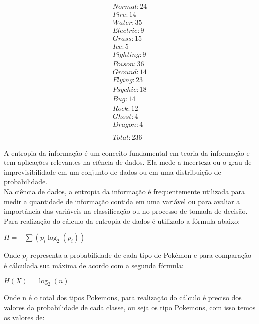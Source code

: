 \documentclass[a4paper,12pt]{article}
\begin{document}
\begin{align*}
Normal: 24 \\
Fire: 14 \\
Water: 35 \\
Electric: 9 \\
Grass: 15 \\
Ice: 5 \\
Fighting: 9 \\
Poison: 36 \\
Ground: 14 \\
Flying: 23 \\
Psychic: 18 \\
Bug: 14 \\
Rock: 12 \\
Ghost: 4 \\
Dragon: 4 \\
\\Total: 236     
\end{align*}


\pagebreak

A entropia da informação é um conceito fundamental em teoria da informação e tem aplicações relevantes na ciência de dados. Ela mede a incerteza ou o grau de imprevisibilidade em um conjunto de dados ou em uma distribuição de probabilidade.\\

Na ciência de dados, a entropia da informação é frequentemente utilizada para medir a quantidade de informação contida em uma variável ou para avaliar a importância das variáveis na classificação ou no processo de tomada de decisão.\\

Para realização do cálculo da entropia de dados é utilizado a fórmula abaixo:

\begin{center}
  $H = -\sum{(p_i \log_2(p_i))}$
\end{center}

Onde $p_i$ representa a probabilidade de cada tipo de Pokémon e para comparação é cálculada sua máxima de acordo com a segunda fórmula:

\begin{center}
$H(X) = \log_2(n)$ 
\end{center}

Onde n é o total dos tipos Pokemons, para realização do cálculo é preciso dos valores da probabilidade de cada classe, ou seja os tipo Pokemons, com isso temos os valores de:
\end{document}
